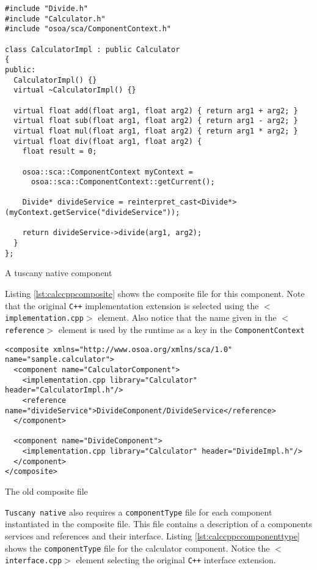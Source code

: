 \begin{listing}
\begin{verbatim}
#include "Divide.h"
#include "Calculator.h"
#include "osoa/sca/ComponentContext.h"

class CalculatorImpl : public Calculator
{
public:
  CalculatorImpl() {}
  virtual ~CalculatorImpl() {}

  virtual float add(float arg1, float arg2) { return arg1 + arg2; }
  virtual float sub(float arg1, float arg2) { return arg1 - arg2; }
  virtual float mul(float arg1, float arg2) { return arg1 * arg2; }
  virtual float div(float arg1, float arg2) {
    float result = 0;

    osoa::sca::ComponentContext myContext = 
      osoa::sca::ComponentContext::getCurrent();

    Divide* divideService = reinterpret_cast<Divide*>(myContext.getService("divideService"));

    return divideService->divide(arg1, arg2);
  }
};
\end{verbatim}
\caption{A tuscany native component}
\label{lst:calccpp}
\end{listing}

Listing \ref{lst:calccppcomposite} shows the composite file for this component. Note that
the original \texttt{C++} implementation extension is selected using the \texttt{$<$implementation.cpp$>$}
element. Also notice that the name given in the \texttt{$<$reference$>$} element is used by
the runtime as a key in the \texttt{ComponentContext}

\begin{listing}
\begin{verbatim}
<composite xmlns="http://www.osoa.org/xmlns/sca/1.0" name="sample.calculator">
  <component name="CalculatorComponent">
    <implementation.cpp library="Calculator" header="CalculatorImpl.h"/>
    <reference name="divideService">DivideComponent/DivideService</reference>
  </component>
        
  <component name="DivideComponent">
    <implementation.cpp library="Calculator" header="DivideImpl.h"/>
  </component>
</composite>
\end{verbatim}
\caption{The old composite file}
\label{lst:calccppcomposite}
\end{listing}

\texttt{Tuscany native} also requires a \texttt{componentType} file for each component instantiated in the composite file.
This file contains a description of a components services and references and their interface. Listing
\ref{lst:calccppccomponenttype} shows the \texttt{componentType} file for the calculator component. Notice
the \texttt{$<$interface.cpp$>$} element selecting the original \texttt{C++} interface extension.

